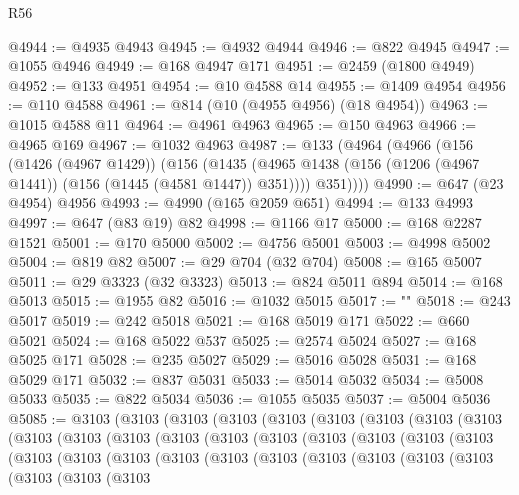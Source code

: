 \begin{lexlean}{R56}
\begin{coremodule}
{{{{{{{{{{{{{{{{{{{{{{{{{{{{{{{{{{{{{{{{{{{{{{{{{{{{{{{{{{{{{{{{{{{{{{{{{{{{{{{{{{{{{{{{{{{{{{{{{{{{{{{{{{{{{{{{{{{{{{{{{{{{{{{{{{{{{{{{{{{{{{{{{{{{{{{{{{{{{{{{{{{{{{{{{{{{{{{{{{{{{{{{{{{{{{{{{{{{{{{{{{{{{{{{{{{@4944 := @4935 @4943
@4945 := @4932 @4944
@4946 := @822 @4945
@4947 := @1055 @4946
@4949 := @168 @4947 @171
@4951 := @2459 (@1800 @4949)
@4952 := @133 @4951
@4954 := @10 @4588 @14
@4955 := @1409 @4954
@4956 := @110 @4588
@4961 := @814 (@10 (@4955 @4956) (@18 @4954))
@4963 := @1015 @4588 @11
@4964 := @4961 @4963
@4965 := @150 @4963
@4966 := @4965 @169
@4967 := @1032 @4963
@4987 := @133
    (@4964
      (@4966
        (@156
          (@1426 (@4967 @1429))
          (@156
            (@1435 (@4965 @1438 (@156 (@1206 (@4967 @1441)) (@156 (@1445 (@4581 @1447)) @351))))
            @351))))
@4990 := @647 (@23 @4954) @4956
@4993 := @4990 (@165 @2059 @651)
@4994 := @133 @4993
@4997 := @647 (@83 @19) @82
@4998 := @1166 @17
@5000 := @168 @2287 @1521
@5001 := @170 @5000
@5002 := @4756 @5001
@5003 := @4998 @5002
@5004 := @819 @82
@5007 := @29 @704 (@32 @704)
@5008 := @165 @5007
@5011 := @29 @3323 (@32 @3323)
@5013 := @824 @5011 @894
@5014 := @168 @5013
@5015 := @1955 @82
@5016 := @1032 @5015
@5017 := "\n"
@5018 := @243 @5017
@5019 := @242 @5018
@5021 := @168 @5019 @171
@5022 := @660 @5021
@5024 := @168 @5022 @537
@5025 := @2574 @5024
@5027 := @168 @5025 @171
@5028 := @235 @5027
@5029 := @5016 @5028
@5031 := @168 @5029 @171
@5032 := @837 @5031
@5033 := @5014 @5032
@5034 := @5008 @5033
@5035 := @822 @5034
@5036 := @1055 @5035
@5037 := @5004 @5036
@5085 := @3103
    (@3103
      (@3103
        (@3103
          (@3103
            (@3103
              (@3103
                (@3103
                  (@3103
                    (@3103
                      (@3103
                        (@3103
                          (@3103
                            (@3103
                              (@3103
                                (@3103
                                  (@3103
                                    (@3103
                                      (@3103
                                        (@3103
                                          (@3103
                                            (@3103
                                              (@3103
                                                (@3103
                                                  (@3103
                                                    (@3103
                                                      (@3103
                                                        (@3103
                                                          (@3103
                                                            (@3103
                                                              (@3103
                                                                (@3103
}}}}}}}}}}}}}}}}}}}}}}}}}}}}}}}}}}}}}}}}}}}}}}}}}}}}}}}}}}}}}}}}}}}}}}}}}}}}}}}}}}}}}}}}}}}}}}}}}}}}}}}}}}}}}}}}}}}}}}}}}}}}}}}}}}}}}}}}}}}}}}}}}}}}}}}}}}}}}}}}}}}}}}}}}}}}}}}}}}}}}}}}}}}}}}}}}}}}}}}}}}}}}}}}}}}
\end{coremodule}
\end{lexlean}
